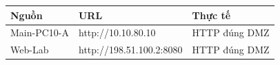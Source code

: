 \begin{tabularx}{\linewidth}{@{}lXX@{}}\toprule
Nguồn & URL & Thực tế\\\midrule
Main-PC10-A & http://10.10.80.10 & HTTP đúng DMZ\\
Web-Lab & http://198.51.100.2:8080 & HTTP đúng DMZ\\
\bottomrule\end{tabularx}
